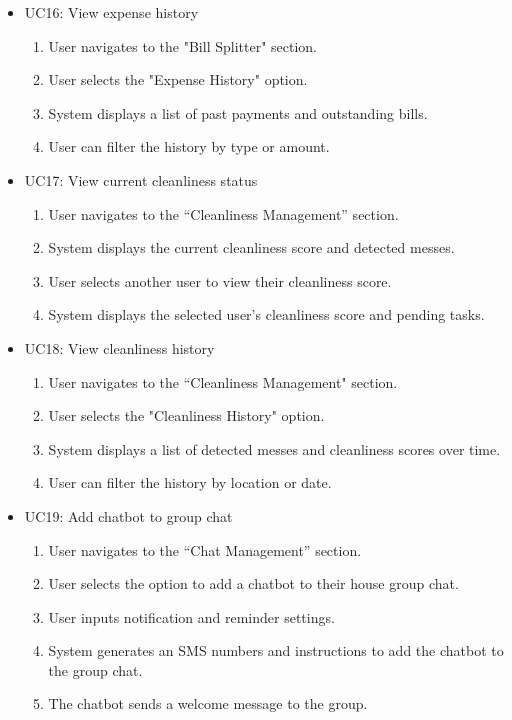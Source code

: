 \documentclass{scrreprt}
\theoremstyle{definition}
\begin{document}
\begin{itemize}
    \item UC16: View expense history
    \begin{enumerate}
        \item User navigates to the "Bill Splitter" section.
        \item User selects the "Expense History" option.
        \item System displays a list of past payments and outstanding bills.
        \item User can filter the history by type or amount.
    \end{enumerate}
    
    \item UC17: View current cleanliness status
    \begin{enumerate}
        \item User navigates to the “Cleanliness Management” section.
        \item System displays the current cleanliness score and detected messes.
        \item User selects another user to view their cleanliness score.
        \item System displays the selected user’s cleanliness score and pending tasks.
    \end{enumerate}
    
    \item UC18: View cleanliness history
    \begin{enumerate}
        \item User navigates to the “Cleanliness Management" section.
        \item User selects the "Cleanliness History" option.
        \item System displays a list of detected messes and cleanliness scores over time.
        \item User can filter the history by location or date.
    \end{enumerate}
    
    \item UC19: Add chatbot to group chat
    \begin{enumerate}
        \item User navigates to the “Chat Management” section.
        \item User selects the option to add a chatbot to their house group chat.
        \item User inputs notification and reminder settings.
        \item System generates an SMS numbers and instructions to add the chatbot to the group chat.
        \item The chatbot sends a welcome message to the group.
    \end{enumerate}
    

\end{itemize}
\end{document}
